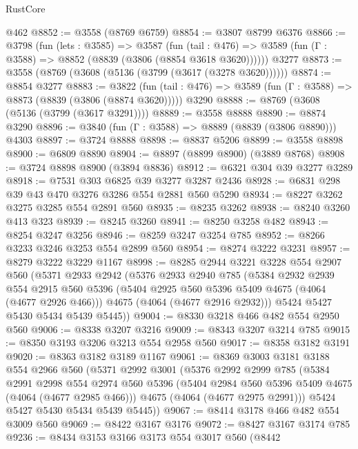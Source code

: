 \begin{lexlean}{RustCore}
\begin{coremodule}
    @462
@8852 := @3558 (@8769 @6759)
@8854 := @3807 @8799 @6376
@8866 := @3798
    (fun (lets : @3585) =>
    @3587
      (fun (tail : @476) => @3589 (fun (Γ : @3588) => @8852 (@8839 (@3806 (@8854 @3618 @3620))))))
    @3277
@8873 := @3558 (@8769 (@3608 (@5136 (@3799 (@3617 (@3278 @3620))))))
@8874 := @8854 @3277
@8883 := @3822
    (fun (tail : @476) => @3589 (fun (Γ : @3588) => @8873 (@8839 (@3806 (@8874 @3620)))))
    @3290
@8888 := @8769 (@3608 (@5136 (@3799 (@3617 @3291))))
@8889 := @3558 @8888
@8890 := @8874 @3290
@8896 := @3840 (fun (Γ : @3588) => @8889 (@8839 (@3806 @8890))) @4303
@8897 := @3724 @8888
@8898 := @8837 @5206
@8899 := @3558 @8898
@8900 := @6809 @8890
@8904 := @8897 (@8899 @8900) (@3889 @8768)
@8908 := @3724 @8898 @8900 (@3894 @8836)
@8912 := @6321 @304 @39 @3277 @3289
@8918 := @7531 @303 @6825 @39 @3277 @3287 @2436
@8928 := @6831 @298 @39 @43 @470 @3276 @3286 @554 @2881 @560 @5290
@8934 := @8227 @3262 @3275 @3285 @554 @2891 @560
@8935 := @8235 @3262
@8938 := @8240 @3260 @413 @323
@8939 := @8245 @3260
@8941 := @8250 @3258 @482
@8943 := @8254 @3247 @3256
@8946 := @8259 @3247 @3254 @785
@8952 := @8266 @3233 @3246 @3253 @554 @2899 @560
@8954 := @8274 @3222 @3231
@8957 := @8279 @3222 @3229 @1167
@8998 := @8285
    @2944
    @3221
    @3228
    @554
    @2907
    @560
    (@5371
      @2933
      @2942
      (@5376
        @2933
        @2940
        @785
        (@5384
          @2932
          @2939
          @554
          @2915
          @560
          @5396
          (@5404 @2925 @560 @5396 @5409 @4675 (@4064 (@4677 @2926 @466)))
          @4675
          (@4064 (@4677 @2916 @2932)))
        @5424
        @5427
        @5430
        @5434
        @5439
        @5445))
@9004 := @8330 @3218 @466 @482 @554 @2950 @560
@9006 := @8338 @3207 @3216
@9009 := @8343 @3207 @3214 @785
@9015 := @8350 @3193 @3206 @3213 @554 @2958 @560
@9017 := @8358 @3182 @3191
@9020 := @8363 @3182 @3189 @1167
@9061 := @8369
    @3003
    @3181
    @3188
    @554
    @2966
    @560
    (@5371
      @2992
      @3001
      (@5376
        @2992
        @2999
        @785
        (@5384
          @2991
          @2998
          @554
          @2974
          @560
          @5396
          (@5404 @2984 @560 @5396 @5409 @4675 (@4064 (@4677 @2985 @466)))
          @4675
          (@4064 (@4677 @2975 @2991)))
        @5424
        @5427
        @5430
        @5434
        @5439
        @5445))
@9067 := @8414 @3178 @466 @482 @554 @3009 @560
@9069 := @8422 @3167 @3176
@9072 := @8427 @3167 @3174 @785
@9236 := @8434
    @3153
    @3166
    @3173
    @554
    @3017
    @560
    (@8442

\end{coremodule}
\end{lexlean}

